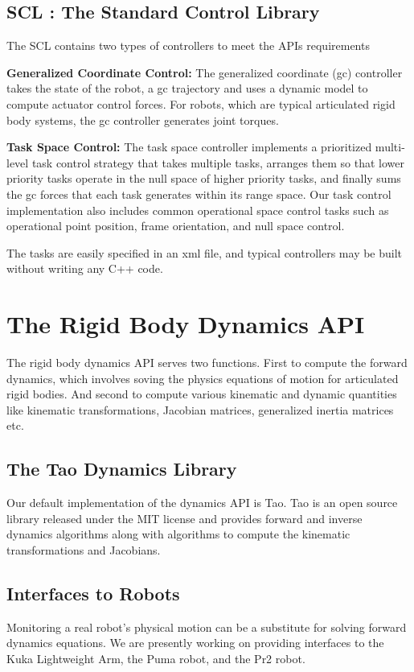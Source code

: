 \documentclass[12pt]{article}
\begin{document}
\subsection{SCL : The Standard Control Library}
The SCL contains two types of controllers to meet the APIs requirements
\begin{description}
  \item{\bf Generalized Coordinate Control:} The generalized coordinate (gc) controller
takes the state of the robot, a gc trajectory and uses a dynamic model to compute
actuator control forces. For robots, which are typical articulated rigid body systems,
the gc controller generates joint torques.

  \item{\bf Task Space Control:} The task space controller implements a prioritized 
multi-level task control strategy that takes multiple tasks, arranges them so that lower
priority tasks operate in the null space of higher priority tasks, and finally sums
the gc forces that each task generates within its range space. Our task control 
implementation also includes common operational space control tasks such as 
operational point position, frame orientation, and null space control. 

The tasks are easily specified in an xml file, and typical controllers may be built
without writing any C++ code.
\end{description}

\section{The Rigid Body Dynamics API}
The rigid body dynamics API serves two functions. First to compute the forward dynamics,
which involves soving the physics equations of motion for articulated rigid bodies. And
second to compute various kinematic and dynamic quantities like kinematic 
transformations, Jacobian matrices, generalized inertia matrices etc.

\subsection{The Tao Dynamics Library}
Our default implementation of the dynamics API is Tao. Tao is an open source library
released under the MIT license and provides forward and inverse dynamics algorithms
along with algorithms to compute the kinematic transformations and Jacobians.

\subsection{Interfaces to Robots}
Monitoring a real robot's physical motion can be a substitute for solving forward
dynamics equations. We are presently working on providing interfaces to the Kuka
Lightweight Arm, the Puma robot, and the Pr2 robot.
\end{document}
